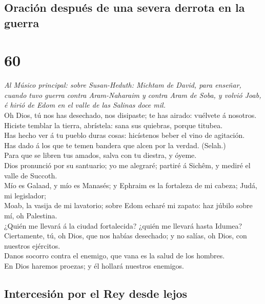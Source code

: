 \hypertarget{oraciuxf3n-despuuxe9s-de-una-severa-derrota-en-la-guerra}{%
\subsection{Oración después de una severa derrota en la
guerra}\label{oraciuxf3n-despuuxe9s-de-una-severa-derrota-en-la-guerra}}

\hypertarget{section-59}{%
\section{60}\label{section-59}}

 \emph{Al Músico principal: sobre Susan-Heduth: Michtam de
David, para enseñar, cuando tuvo guerra contra Aram-Naharaim y contra
Aram de Soba, y volvió Joab, é hirió de Edom en el valle de las Salinas
doce mil.}\\
Oh Dios, tú nos has desechado, nos disipaste; te has airado: vuélvete á
nosotros.\\
 Hiciste temblar la tierra, abrístela: sana sus quiebras,
porque titubea.\\
 Has hecho ver á tu pueblo duras cosas: hicístenos beber el
vino de agitación.\\
 Has dado á los que te temen bandera que alcen por la
verdad. (Selah.)\\
 Para que se libren tus amados, salva con tu diestra, y
óyeme.\\
 Dios pronunció por su santuario; yo me alegraré; partiré á
Sichêm, y mediré el valle de Succoth.\\
 Mío es Galaad, y mío es Manasés; y Ephraim es la fortaleza
de mi cabeza; Judá, mi legislador;\\
 Moab, la vasija de mi lavatorio; sobre Edom echaré mi
zapato: haz júbilo sobre mí, oh Palestina.\\
 ¿Quién me llevará á la ciudad fortalecida? ¿quién me
llevará hasta Idumea?\\
 Ciertamente, tú, oh Dios, que nos habías desechado; y no
salías, oh Dios, con nuestros ejércitos.\\
 Danos socorro contra el enemigo, que vana es la salud de
los hombres.\\
 En Dios haremos proezas; y él hollará nuestros enemigos.

\hypertarget{intercesiuxf3n-por-el-rey-desde-lejos}{%
\subsection{Intercesión por el Rey desde
lejos}\label{intercesiuxf3n-por-el-rey-desde-lejos}}

